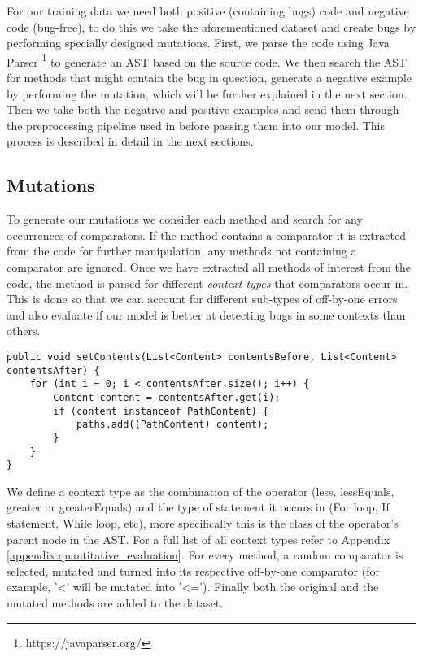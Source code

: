 For our training data we need both positive (containing bugs) code and negative code (bug-free), to do this we take the aforementioned dataset and create bugs by performing specially designed mutations. First, we parse the code using Java Parser \footnote{https://javaparser.org/} to generate an AST based on the source code. We then search the AST for methods that might contain the bug in question, generate a negative example by performing the mutation, which will be further explained in the next section. Then we take both the negative and positive examples and send them through the preprocessing pipeline used in \cite{alon2019code2vec} before passing them into our model. This process is described in detail in the next sections.



\subsection{Mutations}\label{sec:mutations}

To generate our mutations we consider each method and search for any occurrences of comparators. If the method contains a comparator it is extracted from the code for further manipulation, any methods not containing a comparator are ignored. Once we have extracted all methods of interest from the code, the method is parsed for different \textit{context types} that comparators occur in. This is done so that we can account for different sub-types of off-by-one errors and also evaluate if our model is better at detecting bugs in some contexts than others. 

\begin{lstlisting}[caption={An example of a method before mutation. The context type of this comparator is FORless},captionpos=b]
public void setContents(List<Content> contentsBefore, List<Content> contentsAfter) {
    for (int i = 0; i < contentsAfter.size(); i++) {
        Content content = contentsAfter.get(i);
        if (content instanceof PathContent) {
            paths.add((PathContent) content);
        }
    }
}
\end{lstlisting}

We define a context type as the combination of the operator (less, lessEquals, greater or greaterEquals) and the type of statement it occurs in (For loop, If statement, While loop, etc), more specifically this is the class of the operator's parent node in the AST. For a full list of all context types refer to Appendix \ref{appendix:quantitative_evaluation}. For every method, a random comparator is selected, mutated and turned into its respective off-by-one comparator (for example, '<' will be mutated into '<='). Finally both the original and the mutated methods are added to the dataset.

